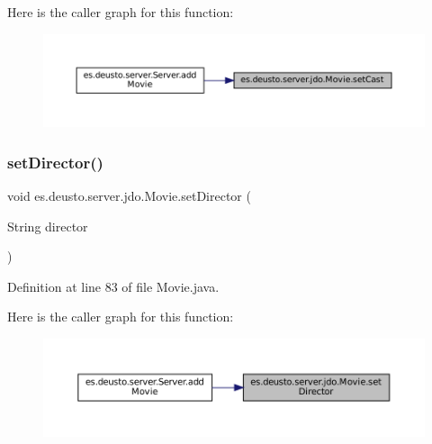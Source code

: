 Here is the caller graph for this function\+:
\nopagebreak
\begin{figure}[H]
\begin{center}
\leavevmode
\includegraphics[width=350pt]{classes_1_1deusto_1_1server_1_1jdo_1_1_movie_aab7fa1af2944677769c47300ea061e3b_icgraph}
\end{center}
\end{figure}
\mbox{\label{classes_1_1deusto_1_1server_1_1jdo_1_1_movie_a2739245f04bc6627b5a00ddeb6fba0fc}} 
\subsubsection{\texorpdfstring{setDirector()}{setDirector()}}
{\footnotesize\ttfamily void es.\+deusto.\+server.\+jdo.\+Movie.\+set\+Director (\begin{DoxyParamCaption}\item[{String}]{director }\end{DoxyParamCaption})}



Definition at line 83 of file Movie.\+java.

Here is the caller graph for this function\+:
\nopagebreak
\begin{figure}[H]
\begin{center}
\leavevmode
\includegraphics[width=350pt]{classes_1_1deusto_1_1server_1_1jdo_1_1_movie_a2739245f04bc6627b5a00ddeb6fba0fc_icgraph}
\end{center}
\end{figure}
\mbox{\label{classes_1_1deusto_1_1server_1_1jdo_1_1_movie_a045b89a0ae1e637d8944f34c97f8c34e}} 
